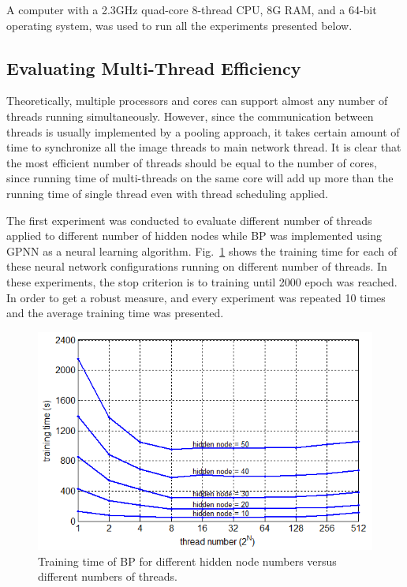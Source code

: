 \documentclass[procedia]{easychair}
\begin{document}
A computer with a 2.3GHz quad-core 8-thread CPU, 8G RAM, and a 64-bit operating system, was used to run all the experiments presented below.

\subsection{Evaluating Multi-Thread Efficiency}

Theoretically, multiple processors and cores can support almost any number of threads running simultaneously.  However, since the communication between threads is usually implemented by a pooling approach, it takes certain amount of time to synchronize all the image threads to main network thread.  It is clear that the most efficient number of threads should be equal to the number of cores, since running time of multi-threads on the same core will add up more than the running time of single thread even with thread scheduling applied.

The first experiment was conducted to evaluate different number of threads applied to different number of hidden nodes while BP was implemented using GPNN as a neural learning algorithm.  Fig.~\ref{fig:thread_efficiency} shows the training time for each of these neural network configurations running on different number of threads.  In these experiments, the stop criterion is to training until 2000 epoch was reached.  In order to get a robust measure, and every experiment was repeated 10 times and the average training time was presented.

\begin{figure}[tb]
    \centering
    \includegraphics[scale=0.6]{../pic/efficiency.png}
    \caption{Training time of BP for different hidden node numbers versus different numbers of threads.}
    \label{fig:thread_efficiency}
\end{figure}
\end{document}
